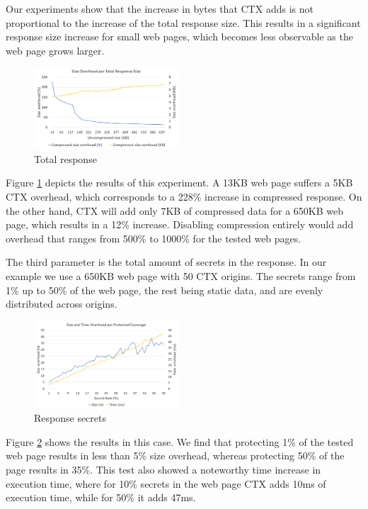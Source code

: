 \documentclass[conference, letterpaper, 10pt]{IEEEtran}
\begin{document}
Our experiments show that the increase in bytes that CTX adds is not
proportional to the increase of the total response size. This results in a
significant response size increase for small web pages, which becomes less
observable as the web page grows larger.

    \begin{figure}[thpb]
        \centering
            \includegraphics[width=0.48\textwidth]{experiments/total_response.png}
        \caption{Total response}
        \label{fig:total_response_ctx}
    \end{figure}

Figure \ref{fig:total_response_ctx} depicts the results of this experiment. A 13KB web page suffers a 5KB
CTX overhead, which corresponds to a 228\% increase in compressed response. On the
other hand, CTX will add only 7KB of compressed data for a 650KB web page, which
results in a 12\% increase. Disabling compression entirely would add overhead
that ranges from 500\% to 1000\% for the tested web pages.

The third parameter is the total amount of secrets in the response. In our
example we use a 650KB web page with 50 CTX origins. The secrets range from 1\%
up to 50\% of the web page, the rest being static data, and are evenly
distributed across origins.

    \begin{figure}[thpb]
        \centering
            \includegraphics[width=0.48\textwidth]{experiments/response_secrets.png}
        \caption{Response secrets}
        \label{fig:response_secrets_ctx}
    \end{figure}

Figure \ref{fig:response_secrets_ctx} shows the results in this case. We find that protecting 1\% of the
tested web page results in less than 5\% size overhead, whereas protecting 50\% of
the page results in 35\%. This test also showed a noteworthy time increase in
execution time, where for 10\% secrets in the web page CTX adds 10ms of
execution time, while for 50\% it adds 47ms.
\end{document}
